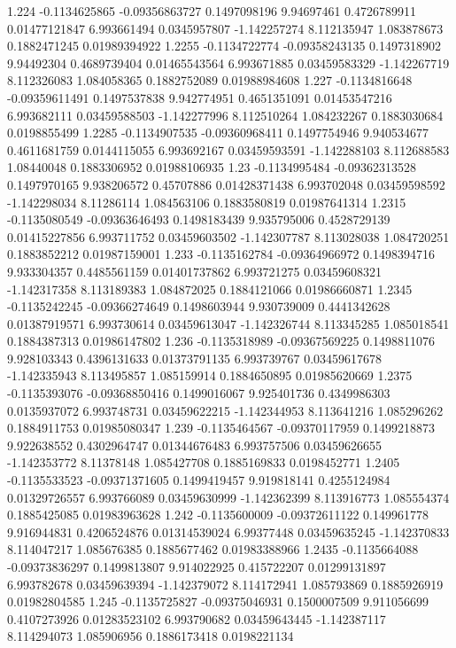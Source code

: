 {1.224 -0.1134625865 -0.09356863727 0.1497098196 9.94697461 0.4726789911 0.01477121847 6.993661494 0.0345957807 -1.142257274 8.112135947 1.083878673 0.1882471245 0.01989394922
1.2255 -0.1134722774 -0.09358243135 0.1497318902 9.94492304 0.4689739404 0.01465543564 6.993671885 0.03459583329 -1.142267719 8.112326083 1.084058365 0.1882752089 0.01988984608
1.227 -0.1134816648 -0.09359611491 0.1497537838 9.942774951 0.4651351091 0.01453547216 6.993682111 0.03459588503 -1.142277996 8.112510264 1.084232267 0.1883030684 0.0198855499
1.2285 -0.1134907535 -0.09360968411 0.1497754946 9.940534677 0.4611681759 0.0144115055 6.993692167 0.03459593591 -1.142288103 8.112688583 1.08440048 0.1883306952 0.01988106935
1.23 -0.1134995484 -0.09362313528 0.1497970165 9.938206572 0.45707886 0.01428371438 6.993702048 0.03459598592 -1.142298034 8.11286114 1.084563106 0.1883580819 0.01987641314
1.2315 -0.1135080549 -0.09363646493 0.1498183439 9.935795006 0.4528729139 0.01415227856 6.993711752 0.03459603502 -1.142307787 8.113028038 1.084720251 0.1883852212 0.01987159001
1.233 -0.1135162784 -0.09364966972 0.1498394716 9.933304357 0.4485561159 0.01401737862 6.993721275 0.03459608321 -1.142317358 8.113189383 1.084872025 0.1884121066 0.01986660871
1.2345 -0.1135242245 -0.09366274649 0.1498603944 9.930739009 0.4441342628 0.01387919571 6.993730614 0.03459613047 -1.142326744 8.113345285 1.085018541 0.1884387313 0.01986147802
1.236 -0.1135318989 -0.09367569225 0.1498811076 9.928103343 0.4396131633 0.01373791135 6.993739767 0.03459617678 -1.142335943 8.113495857 1.085159914 0.1884650895 0.01985620669
1.2375 -0.1135393076 -0.09368850416 0.1499016067 9.925401736 0.4349986303 0.0135937072 6.993748731 0.03459622215 -1.142344953 8.113641216 1.085296262 0.1884911753 0.01985080347
1.239 -0.1135464567 -0.09370117959 0.1499218873 9.922638552 0.4302964747 0.01344676483 6.993757506 0.03459626655 -1.142353772 8.11378148 1.085427708 0.1885169833 0.0198452771
1.2405 -0.1135533523 -0.09371371605 0.1499419457 9.919818141 0.4255124984 0.01329726557 6.993766089 0.03459630999 -1.142362399 8.113916773 1.085554374 0.1885425085 0.01983963628
1.242 -0.1135600009 -0.09372611122 0.149961778 9.916944831 0.4206524876 0.01314539024 6.99377448 0.03459635245 -1.142370833 8.114047217 1.085676385 0.1885677462 0.01983388966
1.2435 -0.1135664088 -0.09373836297 0.1499813807 9.914022925 0.415722207 0.01299131897 6.993782678 0.03459639394 -1.142379072 8.114172941 1.085793869 0.1885926919 0.01982804585
1.245 -0.1135725827 -0.09375046931 0.1500007509 9.911056699 0.4107273926 0.01283523102 6.993790682 0.03459643445 -1.142387117 8.114294073 1.085906956 0.1886173418 0.0198221134
}
